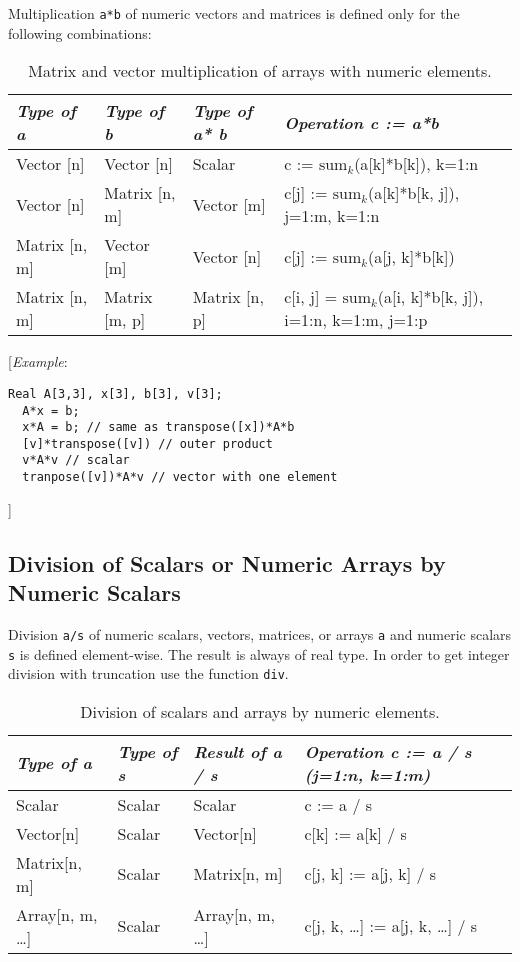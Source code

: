 Multiplication \lstinline!a*b! of numeric vectors and matrices is defined only for
the following combinations:

\begin{longtable}[]{|l|l|l|l|}
\caption{Matrix and vector multiplication of arrays with numeric elements.}\\
\hline
\emph{Type of a} & \emph{Type of b} & \emph{Type of a* b} &
\emph{Operation c := a*b}\\ \hline
\endhead
Vector {[}n{]} & Vector {[}n{]} & Scalar & c :=
$\textrm{sum}_k$(a{[}k{]}*b{[}k{]}), k=1:n\\ \hline
Vector {[}n{]} & Matrix {[}n, m{]} & Vector {[}m{]} & c{[}j{]} :=
$\textrm{sum}_k$(a{[}k{]}*b{[}k, j{]}), j=1:m, k=1:n\\ \hline
Matrix {[}n, m{]} & Vector {[}m{]} & Vector {[}n{]} & c{[}j{]} :=
$\textrm{sum}_k$(a{[}j, k{]}*b{[}k{]})\\ \hline
Matrix {[}n, m{]} & Matrix {[}m, p{]} & Matrix {[}n, p{]} & c{[}i, j{]}
= $\textrm{sum}_k$(a{[}i, k{]}*b{[}k, j{]}), i=1:n, k=1:m,
j=1:p\\ \hline

\end{longtable}

{[}\emph{Example}:

\begin{lstlisting}[language=modelica]
  Real A[3,3], x[3], b[3], v[3];
  A*x = b;
  x*A = b; // same as transpose([x])*A*b
  [v]*transpose([v]) // outer product
  v*A*v // scalar
  tranpose([v])*A*v // vector with one element
\end{lstlisting}
{]}

\subsection{Division of Scalars or Numeric Arrays by Numeric Scalars}

Division \lstinline!a/s! of numeric scalars, vectors, matrices, or arrays \lstinline!a! and
numeric scalars \lstinline!s! is defined element-wise. The result is always of real
type. In order to get integer division with truncation use the function
\lstinline!div!.

\begin{longtable}[]{|l|l|l|l|}
\caption{Division of scalars and arrays by numeric elements.}\\
\hline \endhead
\emph{Type of a} & \emph{Type of s} & \emph{Result of a / s} &
\emph{Operation c := a / s (j=1:n, k=1:m)}\\ \hline
Scalar & Scalar & Scalar & c := a / s\\ \hline
Vector{[}n{]} & Scalar & Vector{[}n{]} & c{[}k{]} := a{[}k{]} /
s\\ \hline
Matrix{[}n, m{]} & Scalar & Matrix{[}n, m{]} & c{[}j, k{]} := a{[}j,
k{]} / s\\ \hline
Array{[}n, m, \ldots{}{]} & Scalar & Array{[}n, m, \ldots{}{]} & c{[}j,
k, \ldots{}{]} := a{[}j, k, \ldots{}{]} / s\\ \hline

\end{longtable}

